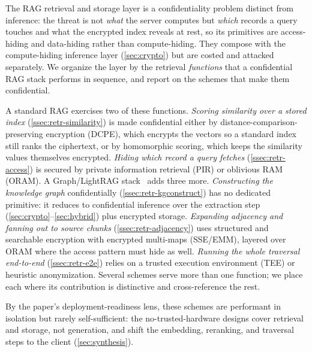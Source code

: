 
The RAG retrieval and storage layer is a confidentiality problem distinct from inference: the
threat is not \emph{what} the server computes but \emph{which} records a query touches and what
the encrypted index reveals at rest, so its primitives are access-hiding and data-hiding rather
than compute-hiding. They compose with the compute-hiding inference layer (\cref{sec:crypto})
but are costed and attacked separately. We organize the layer by the retrieval \emph{functions} that a confidential RAG stack performs in sequence, and report on the schemes that make them confidential.

A standard RAG exercises two of these functions. \emph{Scoring similarity over a stored
index} (\cref{ssec:retr-similarity}) is made confidential either by distance-comparison-preserving
encryption (DCPE), which encrypts the vectors so a standard index still ranks the ciphertext, or
by homomorphic scoring, which keeps the similarity values themselves encrypted. \emph{Hiding which
record a query fetches} (\cref{ssec:retr-access}) is secured by private information retrieval (PIR)
or oblivious RAM (ORAM). A Graph/LightRAG stack~\citep{guo_lightrag} adds three more.
\emph{Constructing the knowledge graph} confidentially (\cref{ssec:retr-kgconstruct}) has no
dedicated primitive: it reduces to confidential inference over the extraction step
(\cref{sec:crypto}--\cref{sec:hybrid}) plus encrypted storage. \emph{Expanding adjacency and
fanning out to source chunks} (\cref{ssec:retr-adjacency}) uses structured and searchable
encryption with encrypted multi-maps (SSE/EMM), layered over ORAM where the access pattern must
hide as well. \emph{Running the whole traversal end-to-end} (\cref{ssec:retr-e2e}) relies on a
trusted execution environment (TEE) or heuristic anonymization. Several schemes serve more than
one function; we place each where its contribution is distinctive and cross-reference the rest.

By the paper's deployment-readiness lens, these schemes are performant in isolation but rarely
self-sufficient: the no-trusted-hardware designs cover retrieval and storage, not generation, and
shift the embedding, reranking, and traversal steps to the client (\cref{sec:synthesis}).

